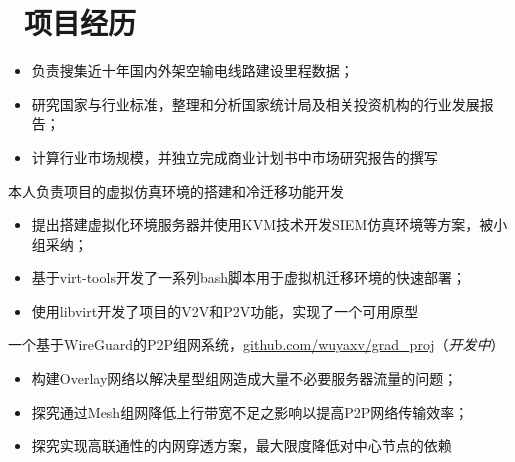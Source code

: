 \documentclass{resume}
\begin{document}
\section{\faUsers\ 项目经历}
\begin{itemize}
  \item 负责搜集近十年国内外架空输电线路建设里程数据；
  \item 研究国家与行业标准，整理和分析国家统计局及相关投资机构的行业发展报告；
  \item 计算行业市场规模，并独立完成商业计划书中市场研究报告的撰写
\end{itemize}
本人负责项目的虚拟仿真环境的搭建和冷迁移功能开发
\begin{itemize}
  \item 提出搭建虚拟化环境服务器并使用KVM技术开发SIEM仿真环境等方案，被小组采纳；
  \item 基于virt-tools开发了一系列bash脚本用于虚拟机迁移环境的快速部署；
  \item 使用libvirt开发了项目的V2V和P2V功能，实现了一个可用原型
\end{itemize}
一个基于WireGuard的P2P组网系统，\href{https://github.com/wuyaxv/grad_proj}{github.com/wuyaxv/grad\_proj}（\textit{开发中}）
\begin{itemize}
  \item 构建Overlay网络以解决星型组网造成大量不必要服务器流量的问题；
  \item 探究通过Mesh组网降低上行带宽不足之影响以提高P2P网络传输效率；
  \item 探究实现高联通性的内网穿透方案，最大限度降低对中心节点的依赖
\end{itemize}

\end{document}

